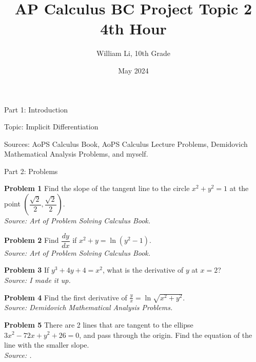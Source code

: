 \documentclass{article}
\title{AP Calculus BC Project Topic 2 4th Hour}
\author{William Li, 10th Grade}
\date{May 2024}
\begin{document}
\maketitle

\LARGE Part 1: Introduction

\hspace{1cm}

\Large Topic: Implicit Differentiation

Sources: AoPS Calculus Book, AoPS Calculus Lecture Problems, Demidovich Mathematical Analysis Problems, and myself.



\newpage

\begin{comment}
    Implicit Differentiation Problems
\end{comment}

\LARGE Part 2: Problems

\vspace{2cm}

\large

\textbf{Problem 1} Find the slope of the tangent line to the circle $x^2 + y^2 = 1$ at the point $\left( \dfrac {\sqrt{2}} {2}, \dfrac {\sqrt {2}} {2} \right)$.\\
\textit{Source: Art of Problem Solving Calculus Book.}

\vspace{1cm}

\textbf{Problem 2} Find $\dfrac {dy} {dx}$ if $x^2 + y = \ln(y^2 - 1)$.\\
\textit{Source: Art of Problem Solving Calculus Book.}

\vspace{1cm}

\textbf{Problem 3} If $y^3 + 4y + 4 = x^2$, what is the derivative of $y$ at $x = 2$?\\
\textit{Source: I made it up.}

\vspace{1cm}

\textbf{Problem 4} Find the first derivative of $\frac {y} {x} = \ln \sqrt{x^2 + y^2}$.\\
\textit{Source: Demidovich Mathematical Analysis Problems.}\\

\vspace{1cm}

\textbf{Problem 5} There are 2 lines that are tangent to the ellipse $3x^2 - 72x + y^2 +26 = 0$, and pass through the origin. Find the equation of the line with the smaller slope.\\
\textit{Source: .}
\end{document}
